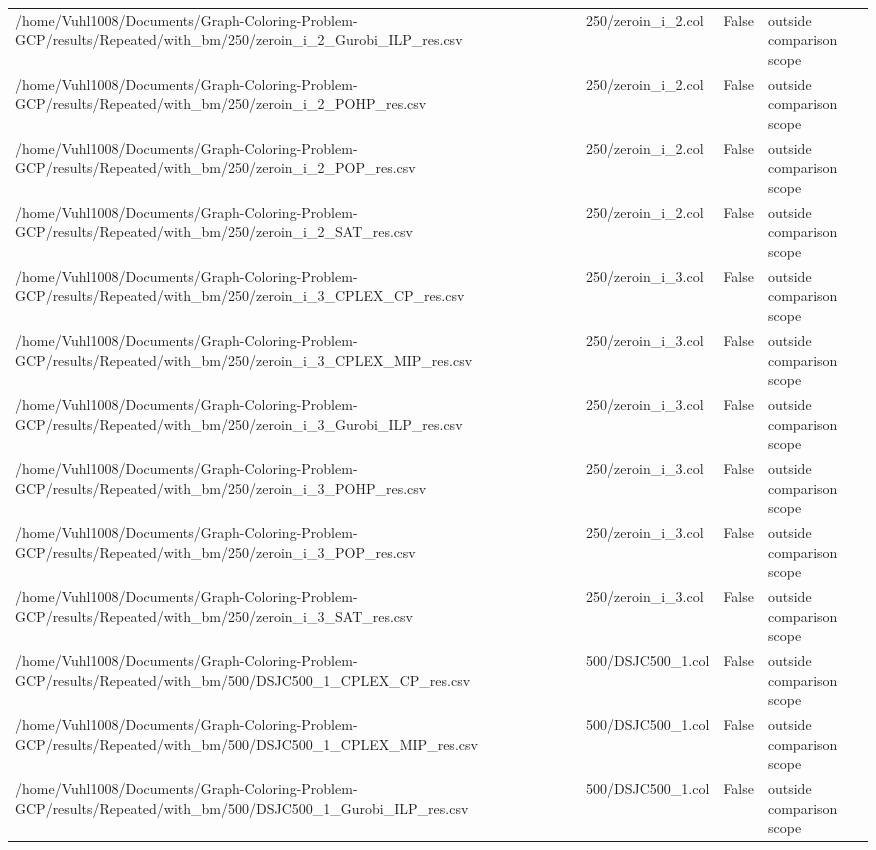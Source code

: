 \begin{table}[htbp]
\begin{tabular}{llll}
/home/Vuhl1008/Documents/Graph-Coloring-Problem-GCP/results/Repeated/with\_bm/250/zeroin\_i\_2\_Gurobi\_ILP\_res.csv & 250/zeroin\_i\_2.col & False & outside comparison scope \\
/home/Vuhl1008/Documents/Graph-Coloring-Problem-GCP/results/Repeated/with\_bm/250/zeroin\_i\_2\_POHP\_res.csv & 250/zeroin\_i\_2.col & False & outside comparison scope \\
/home/Vuhl1008/Documents/Graph-Coloring-Problem-GCP/results/Repeated/with\_bm/250/zeroin\_i\_2\_POP\_res.csv & 250/zeroin\_i\_2.col & False & outside comparison scope \\
/home/Vuhl1008/Documents/Graph-Coloring-Problem-GCP/results/Repeated/with\_bm/250/zeroin\_i\_2\_SAT\_res.csv & 250/zeroin\_i\_2.col & False & outside comparison scope \\
/home/Vuhl1008/Documents/Graph-Coloring-Problem-GCP/results/Repeated/with\_bm/250/zeroin\_i\_3\_CPLEX\_CP\_res.csv & 250/zeroin\_i\_3.col & False & outside comparison scope \\
/home/Vuhl1008/Documents/Graph-Coloring-Problem-GCP/results/Repeated/with\_bm/250/zeroin\_i\_3\_CPLEX\_MIP\_res.csv & 250/zeroin\_i\_3.col & False & outside comparison scope \\
/home/Vuhl1008/Documents/Graph-Coloring-Problem-GCP/results/Repeated/with\_bm/250/zeroin\_i\_3\_Gurobi\_ILP\_res.csv & 250/zeroin\_i\_3.col & False & outside comparison scope \\
/home/Vuhl1008/Documents/Graph-Coloring-Problem-GCP/results/Repeated/with\_bm/250/zeroin\_i\_3\_POHP\_res.csv & 250/zeroin\_i\_3.col & False & outside comparison scope \\
/home/Vuhl1008/Documents/Graph-Coloring-Problem-GCP/results/Repeated/with\_bm/250/zeroin\_i\_3\_POP\_res.csv & 250/zeroin\_i\_3.col & False & outside comparison scope \\
/home/Vuhl1008/Documents/Graph-Coloring-Problem-GCP/results/Repeated/with\_bm/250/zeroin\_i\_3\_SAT\_res.csv & 250/zeroin\_i\_3.col & False & outside comparison scope \\
/home/Vuhl1008/Documents/Graph-Coloring-Problem-GCP/results/Repeated/with\_bm/500/DSJC500\_1\_CPLEX\_CP\_res.csv & 500/DSJC500\_1.col & False & outside comparison scope \\
/home/Vuhl1008/Documents/Graph-Coloring-Problem-GCP/results/Repeated/with\_bm/500/DSJC500\_1\_CPLEX\_MIP\_res.csv & 500/DSJC500\_1.col & False & outside comparison scope \\
/home/Vuhl1008/Documents/Graph-Coloring-Problem-GCP/results/Repeated/with\_bm/500/DSJC500\_1\_Gurobi\_ILP\_res.csv & 500/DSJC500\_1.col & False & outside comparison scope \\

\end{tabular}
\end{table}

